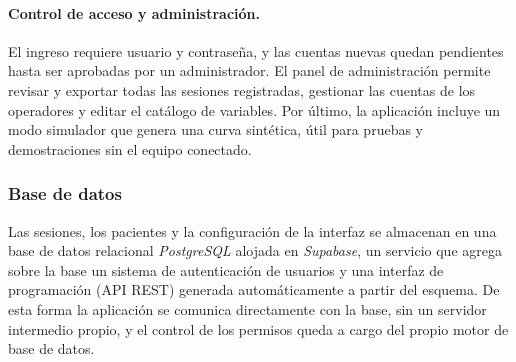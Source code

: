 \documentclass[12pt,a4paper]{article}
\begin{document}
\paragraph{Control de acceso y administración.} El ingreso requiere usuario y contraseña, y las cuentas nuevas quedan pendientes hasta ser aprobadas por un administrador. El panel de administración permite revisar y exportar todas las sesiones registradas, gestionar las cuentas de los operadores y editar el catálogo de variables. Por último, la aplicación incluye un modo simulador que genera una curva sintética, útil para pruebas y demostraciones sin el equipo conectado.

\subsubsection{Base de datos}
\label{sec:base_datos}
Las sesiones, los pacientes y la configuración de la interfaz se almacenan en una base de datos relacional \textit{PostgreSQL} alojada en \textit{Supabase}, un servicio que agrega sobre la base un sistema de autenticación de usuarios y una interfaz de programación (API REST) generada automáticamente a partir del esquema. De esta forma la aplicación se comunica directamente con la base, sin un servidor intermedio propio, y el control de los permisos queda a cargo del propio motor de base de datos.
\end{document}
